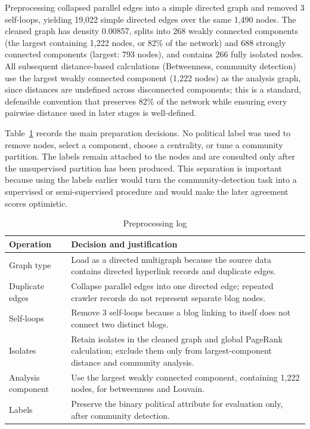 \documentclass[conference]{IEEEtran}
\begin{document}
Preprocessing collapsed parallel edges into a simple directed graph and removed 3 self-loops, yielding 19,022 simple directed edges over the same 1,490 nodes. The cleaned graph has density 0.00857, splits into 268 weakly connected components (the largest containing 1,222 nodes, or 82\% of the network) and 688 strongly connected components (largest: 793 nodes), and contains 266 fully isolated nodes. All subsequent distance-based calculations (Betweenness, community detection) use the largest weakly connected component (1,222 nodes) as the analysis graph, since distances are undefined across disconnected components; this is a standard, defensible convention that preserves 82\% of the network while ensuring every pairwise distance used in later stages is well-defined.

Table~\ref{tab:preprocessing} records the main preparation decisions. No political label was used to remove nodes, select a component, choose a centrality, or tune a community partition. The labels remain attached to the nodes and are consulted only after the unsupervised partition has been produced. This separation is important because using the labels earlier would turn the community-detection task into a supervised or semi-supervised procedure and would make the later agreement scores optimistic.

\begin{table}[htbp]
\caption{Preprocessing log}
\label{tab:preprocessing}
\centering
\begin{tabular}{@{}p{}p{}@{}}
\toprule
Operation & Decision and justification \\
\midrule
Graph type & Load as a directed multigraph because the source data contains directed hyperlink records and duplicate edges. \\
Duplicate edges & Collapse parallel edges into one directed edge; repeated crawler records do not represent separate blog nodes. \\
Self-loops & Remove 3 self-loops because a blog linking to itself does not connect two distinct blogs. \\
Isolates & Retain isolates in the cleaned graph and global PageRank calculation; exclude them only from largest-component distance and community analysis. \\
Analysis component & Use the largest weakly connected component, containing 1,222 nodes, for betweenness and Louvain. \\
Labels & Preserve the binary political attribute for evaluation only, after community detection. \\
\bottomrule
\end{tabular}
\end{table}
\end{document}
